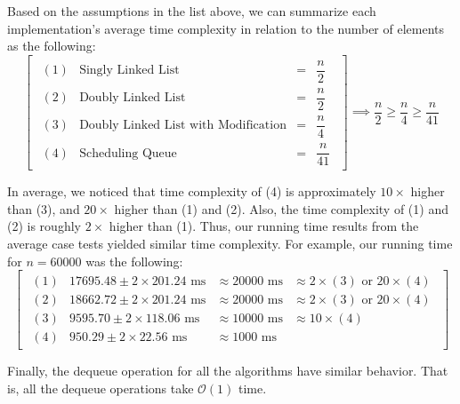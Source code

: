 \documentclass[a4paper,11pt]{kth-mag}
\newcommand*{\skippara}{\par\vspace{\baselineskip} \noindent}
\begin{document}
\skippara Based on the assumptions in the list above, we can summarize each implementation's average time complexity in relation to the number of elements as the following:
\begin{equation*}
    \begin{bmatrix*}
        \begin{array}{llll}
            (1) & \text{Singly Linked List} & = & \dfrac{n}{2} \\[3ex]
            (2) & \text{Doubly Linked List} & = & \dfrac{n}{2} \\[3ex]
            (3) & \text{Doubly Linked List with Modification} & = & \dfrac{n}{4} \\[3ex]
            (4) & \text{Scheduling Queue} & = & \dfrac{n}{41}
        \end{array}
    \end{bmatrix*}
    \implies \frac{n}{2} \ge \frac{n}{4} \ge \frac{n}{41}
\end{equation*}

\skippara In average, we noticed that time complexity of (4) is approximately $10\times$ higher than (3), and $20\times$ higher than (1) and (2).
Also, the time complexity of (1) and (2) is roughly $2\times$ higher than (1).
Thus, our running time results from the average case tests yielded similar time complexity.
For example, our running time for $n=60000$ was the following:
\begin{equation*}
    \begin{bmatrix*}
        \begin{array}{llllll}
            (1) & 17695.48 \pm 2\times 201.24 \text{ ms} & \approx 20000 \text{ ms}  & \approx 2\times(3)\text{ or } 20\times(4) \\[1ex]
            (2) & 18662.72 \pm 2\times 201.24 \text{ ms} & \approx 20000 \text{ ms}  & \approx 2\times(3)\text{ or } 20\times(4) \\[1ex]
            (3) & 9595.70 \pm 2\times 118.06 \text{ ms} & \approx 10000 \text{ ms} & \approx 10\times(4) \\[1ex]
            (4) & 950.29 \pm 2\times 22.56 \text{ ms} & \approx 1000 \text{ ms} &
        \end{array}
    \end{bmatrix*}
\end{equation*}

\skippara Finally, the dequeue operation for all the algorithms have similar behavior.
That is, all the dequeue operations take $\mathcal{O}(1)$ time.
\end{document}
